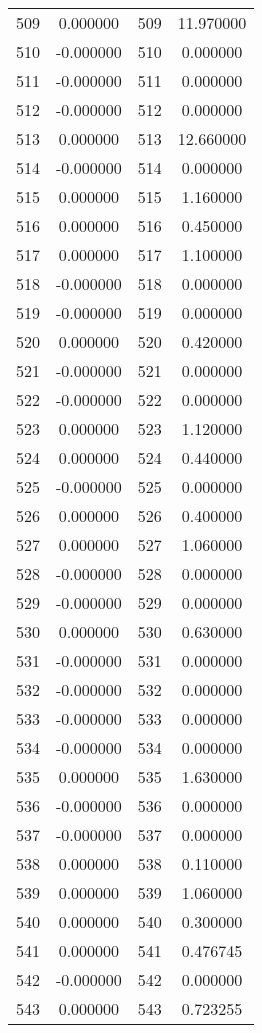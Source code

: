 \documentclass[12pt]{article}
\begin{document}
\begin{longtable}{@{}cccc@{}}
509 & 0.000000 & 509 & 11.970000 \\
510 & -0.000000 & 510 & 0.000000 \\
511 & -0.000000 & 511 & 0.000000 \\
512 & -0.000000 & 512 & 0.000000 \\
513 & 0.000000 & 513 & 12.660000 \\
514 & -0.000000 & 514 & 0.000000 \\
515 & 0.000000 & 515 & 1.160000 \\
516 & 0.000000 & 516 & 0.450000 \\
517 & 0.000000 & 517 & 1.100000 \\
518 & -0.000000 & 518 & 0.000000 \\
519 & -0.000000 & 519 & 0.000000 \\
520 & 0.000000 & 520 & 0.420000 \\
521 & -0.000000 & 521 & 0.000000 \\
522 & -0.000000 & 522 & 0.000000 \\
523 & 0.000000 & 523 & 1.120000 \\
524 & 0.000000 & 524 & 0.440000 \\
525 & -0.000000 & 525 & 0.000000 \\
526 & 0.000000 & 526 & 0.400000 \\
527 & 0.000000 & 527 & 1.060000 \\
528 & -0.000000 & 528 & 0.000000 \\
529 & -0.000000 & 529 & 0.000000 \\
530 & 0.000000 & 530 & 0.630000 \\
531 & -0.000000 & 531 & 0.000000 \\
532 & -0.000000 & 532 & 0.000000 \\
533 & -0.000000 & 533 & 0.000000 \\
534 & -0.000000 & 534 & 0.000000 \\
535 & 0.000000 & 535 & 1.630000 \\
536 & -0.000000 & 536 & 0.000000 \\
537 & -0.000000 & 537 & 0.000000 \\
538 & 0.000000 & 538 & 0.110000 \\
539 & 0.000000 & 539 & 1.060000 \\
540 & 0.000000 & 540 & 0.300000 \\
541 & 0.000000 & 541 & 0.476745 \\
542 & -0.000000 & 542 & 0.000000 \\
543 & 0.000000 & 543 & 0.723255 \\

\end{longtable}
\end{document}
